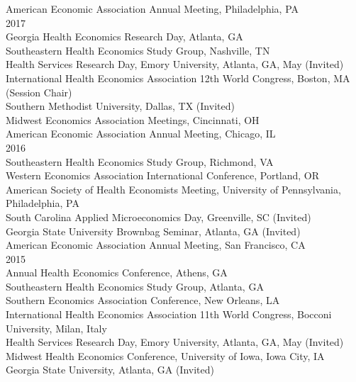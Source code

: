 \documentclass[9pt]{article}
\newenvironment{changemargin}[2]{%
  \begin{list}{}{%
    \setlength{\topsep}{0pt}%
    \setlength{\leftmargin}{#1}%
    \setlength{\rightmargin}{#2}%
    \setlength{\listparindent}{\parindent}%
    \setlength{\itemindent}{\parindent}%
    \setlength{\parsep}{\parskip}%
  }%
  \item[]}{\end{list}
}
\newenvironment{body} {
	\vspace*{-16pt}
	\begin{changemargin}{-0.25in}{-0.5in}
  }	
	{\end{changemargin}
}
\begin{document}
\begin{body}
  American Economic Association Annual Meeting, Philadelphia, PA \\
  \hspace{-.2in} 2017 \\
  Georgia Health Economics Research Day, Atlanta, GA \\
  Southeastern Health Economics Study Group, Nashville, TN \\
  Health Services Research Day, Emory University, Atlanta, GA, May (Invited) \\
  International Health Economics Association 12th World Congress, Boston, MA (Session Chair) \\
  Southern Methodist University, Dallas, TX (Invited) \\
  Midwest Economics Association Meetings, Cincinnati, OH \\
  American Economic Association Annual Meeting, Chicago, IL \\
  \hspace{-.2in} 2016 \\
  Southeastern Health Economics Study Group, Richmond, VA \\
  Western Economics Association International Conference, Portland, OR \\
  American Society of Health Economists Meeting, University of Pennsylvania, Philadelphia, PA \\
  South Carolina Applied Microeconomics Day, Greenville, SC (Invited)  \\
  Georgia State University Brownbag Seminar, Atlanta, GA (Invited) \\
  American Economic Association Annual Meeting, San Francisco, CA \\
  \hspace{-.2in} 2015 \\
  Annual Health Economics Conference, Athens, GA \\
  Southeastern Health Economics Study Group, Atlanta, GA \\
  Southern Economics Association Conference, New Orleans, LA \\
  International Health Economics Association 11th World Congress, Bocconi University, Milan, Italy \\
  Health Services Research Day, Emory University, Atlanta, GA, May (Invited) \\
  Midwest Health Economics Conference, University of Iowa, Iowa City, IA \\
  Georgia State University, Atlanta, GA (Invited) \\

\end{body}
\end{document}
